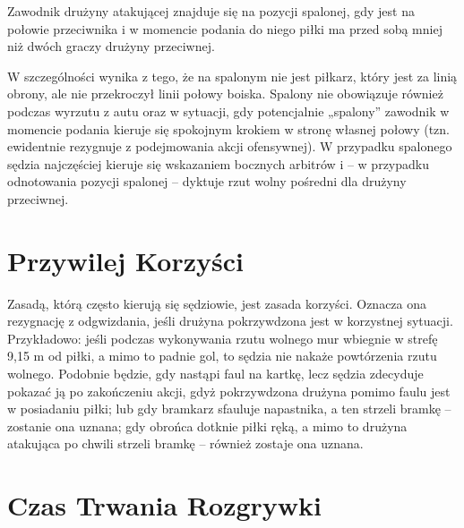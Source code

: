 \documentclass[14pt,oneside,a4paper]{book}
\theoremstyle{break}
\begin{document}
Zawodnik drużyny atakującej znajduje się na pozycji spalonej, gdy jest na połowie przeciwnika i w momencie podania do niego piłki ma przed sobą mniej niż dwóch graczy drużyny przeciwnej.
 
W szczególności wynika z tego, że na spalonym nie jest piłkarz, który jest za linią obrony, ale nie przekroczył linii połowy boiska. Spalony nie obowiązuje również podczas wyrzutu z autu oraz w sytuacji, gdy potencjalnie „spalony” zawodnik w momencie podania kieruje się spokojnym krokiem w stronę własnej połowy (tzn. ewidentnie rezygnuje z podejmowania akcji ofensywnej). W przypadku spalonego sędzia najczęściej kieruje się wskazaniem bocznych arbitrów i – w przypadku odnotowania pozycji spalonej – dyktuje rzut wolny pośredni dla drużyny przeciwnej.

\section {Przywilej Korzyści}

Zasadą, którą często kierują się sędziowie, jest zasada korzyści. Oznacza ona rezygnację z odgwizdania, jeśli drużyna pokrzywdzona jest w korzystnej sytuacji. Przykładowo: jeśli podczas wykonywania rzutu wolnego mur wbiegnie w strefę 9,15 m od piłki, a mimo to padnie gol, to sędzia nie nakaże powtórzenia rzutu wolnego. Podobnie będzie, gdy nastąpi faul na kartkę, lecz sędzia zdecyduje pokazać ją po zakończeniu akcji, gdyż pokrzywdzona drużyna pomimo faulu jest w posiadaniu piłki; lub gdy bramkarz sfauluje napastnika, a ten strzeli bramkę – zostanie ona uznana; gdy obrońca dotknie piłki ręką, a mimo to drużyna atakująca po chwili strzeli bramkę – również zostaje ona uznana.

\section {Czas Trwania Rozgrywki}
\end{document}
